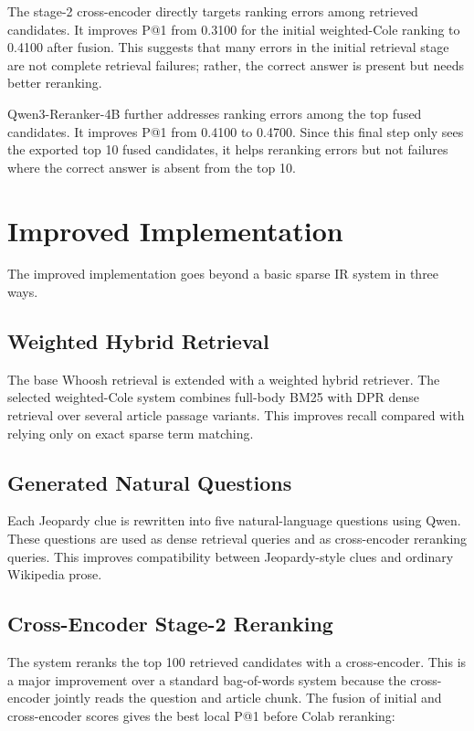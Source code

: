 \documentclass[11pt]{article}
\begin{document}
The stage-2 cross-encoder directly targets ranking errors among retrieved candidates. It improves P@1 from 0.3100 for the initial weighted-Cole ranking to 0.4100 after fusion. This suggests that many errors in the initial retrieval stage are not complete retrieval failures; rather, the correct answer is present but needs better reranking.

Qwen3-Reranker-4B further addresses ranking errors among the top fused candidates. It improves P@1 from 0.4100 to 0.4700. Since this final step only sees the exported top 10 fused candidates, it helps reranking errors but not failures where the correct answer is absent from the top 10.

\section{Improved Implementation}

The improved implementation goes beyond a basic sparse IR system in three ways.

\subsection{Weighted Hybrid Retrieval}

The base Whoosh retrieval is extended with a weighted hybrid retriever. The selected weighted-Cole system combines full-body BM25 with DPR dense retrieval over several article passage variants. This improves recall compared with relying only on exact sparse term matching.

\subsection{Generated Natural Questions}

Each Jeopardy clue is rewritten into five natural-language questions using Qwen. These questions are used as dense retrieval queries and as cross-encoder reranking queries. This improves compatibility between Jeopardy-style clues and ordinary Wikipedia prose.

\subsection{Cross-Encoder Stage-2 Reranking}

The system reranks the top 100 retrieved candidates with a cross-encoder. This is a major improvement over a standard bag-of-words system because the cross-encoder jointly reads the question and article chunk. The fusion of initial and cross-encoder scores gives the best local P@1 before Colab reranking:
\end{document}
